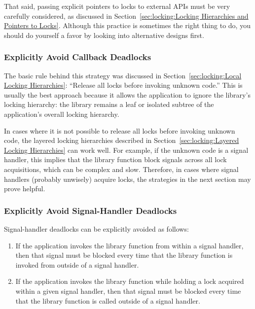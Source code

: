 That said, passing explicit pointers to locks to external APIs must
be very carefully considered, as discussed in
Section~\ref{sec:locking:Locking Hierarchies and Pointers to Locks}.
Although this practice is sometimes the right thing to do, you should do
yourself a favor by looking into alternative designs first.

\subsubsection{Explicitly Avoid Callback Deadlocks}
\label{sec:locking:Explicitly Avoid Callback Deadlocks}

The basic rule behind this strategy was discussed in
Section~\ref{sec:locking:Local Locking Hierarchies}: ``Release all
locks before invoking unknown code.''
This is usually the best approach because it allows the application to
ignore the library's locking hierarchy: the library remains a leaf or
isolated subtree of the application's overall locking hierarchy.

In cases where it is not possible to release all locks before invoking
unknown code, the layered locking hierarchies described in
Section~\ref{sec:locking:Layered Locking Hierarchies} can work well.
For example, if the unknown code is a signal handler, this implies that
the library function block signals across all lock acquisitions, which
can be complex and slow.
Therefore, in cases where signal handlers (probably unwisely) acquire
locks, the strategies in the next section may prove helpful.

\subsubsection{Explicitly Avoid Signal-Handler Deadlocks}
\label{sec:locking:Explicitly Avoid Signal-Handler Deadlocks}

Signal-handler deadlocks can be explicitly avoided as follows:

\begin{enumerate}
\item	If the application invokes the library function from
	within a signal handler, then that signal must be blocked
	every time that the library function is invoked from outside
	of a signal handler.
\item	If the application invokes the library function
	while holding a lock acquired within a given signal
	handler, then that signal must be blocked every time that the
	library function is called outside of a signal handler.
\end{enumerate}


